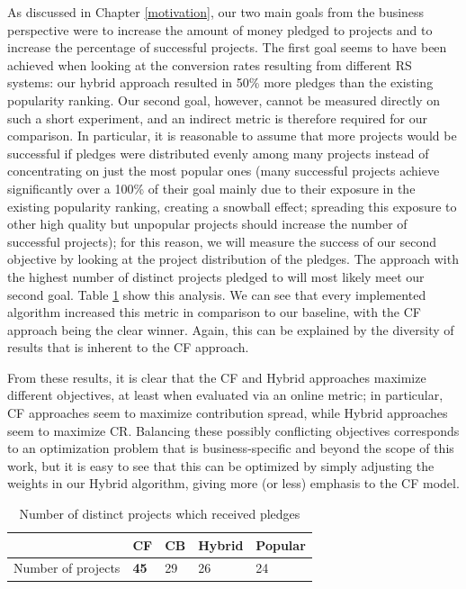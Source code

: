 \documentclass[cic,tc,english]{iiufrgs}
\newcommand{\adriano}[1]{#1}
\begin{document}
As discussed in Chapter \ref{motivation}, our two main goals from the business perspective were to increase the amount of money pledged to projects and to increase the percentage of successful projects. The first goal seems to have been achieved when looking at the conversion rates \adriano{resulting from different RS systems}: our hybrid approach resulted in 50\% more pledges than the existing popularity ranking. Our second goal, however, cannot be measured directly on such a short experiment, and an indirect metric is therefore required for our comparison. In particular, it is reasonable to assume that more projects would be successful if pledges were distributed evenly among many projects instead of concentrating on just the most popular ones \adriano{(many successful projects achieve significantly over a 100\% of their goal mainly due to their exposure in the existing popularity ranking, creating a snowball effect; spreading this exposure to other high quality but unpopular projects should increase the number of successful projects)}; for this reason, we will measure the success of our second objective by looking at the project distribution of the pledges. The approach with the highest number of distinct projects pledged to will most likely meet our second goal. Table \ref{distinct-projects} show this analysis. We can see that every implemented algorithm increased this metric in comparison to our baseline, with the CF approach being the clear winner. Again, this can be explained by the diversity of results that is inherent to the CF approach.

From these results, it is clear that the CF and Hybrid approaches maximize different objectives\adriano{, at least when evaluated via an online metric; in particular, CF approaches seem to maximize contribution spread, while Hybrid approaches seem to maximize CR}. \adriano{Balancing these possibly conflicting objectives corresponds to} an optimization problem that is business-specific and beyond the scope of this work, but it is easy to see that this can be optimized by simply adjusting the weights in our Hybrid algorithm, giving more (or less) emphasis to the CF model.

\begin{table}[ht!]
\centering
\caption{Number of distinct projects which received pledges}
\label{distinct-projects}
\begin{tabular}{|l|l|l|l|l|}
\hline
                   & CF & CB & Hybrid & Popular \\ \hline
Number of projects & \textbf{45} & 29 & 26     & 24      \\ \hline
\end{tabular}
\end{table}
\end{document}
